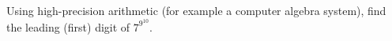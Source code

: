 Using high-precision arithmetic (for example a computer algebra system), find the leading (first) digit of $7^{9^{10}}$.
